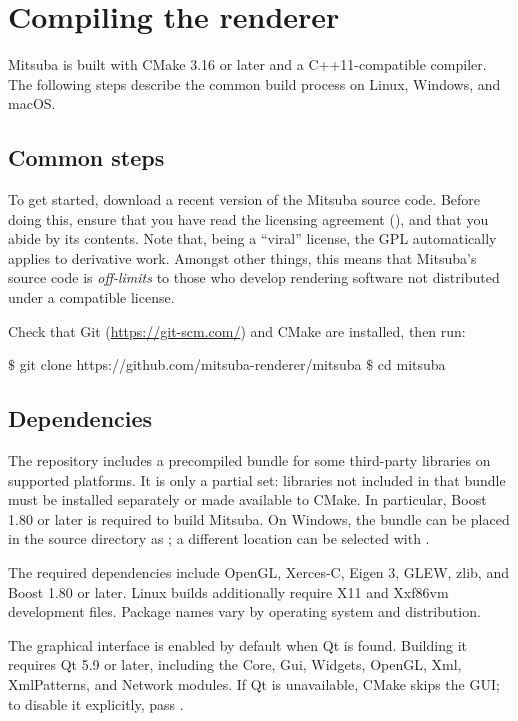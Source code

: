 \section{Compiling the renderer}
\label{sec:compiling}
Mitsuba is built with CMake 3.16 or later and a C++11-compatible compiler.
The following steps describe the common build process on Linux, Windows, and macOS.

\subsection{Common steps}
To get started, download a recent version of the Mitsuba source code. Before
doing this, ensure that you have read the licensing agreement
(), and that you abide by its contents. Note that, being a ``viral''
license, the GPL automatically applies to derivative work. Amongst other things, this
means that Mitsuba's source code is \emph{off-limits} to those who develop rendering
software not distributed under a compatible license.

Check that Git (\url{https://git-scm.com/}) and CMake are installed, then run:
\begin{shell}
$\texttt{\$}$ git clone https://github.com/mitsuba-renderer/mitsuba
$\texttt{\$}$ cd mitsuba
\end{shell}

\subsection{Dependencies}
The repository includes a precompiled  bundle for some third-party
libraries on supported platforms. It is only a partial set: libraries not included in
that bundle must be installed separately or made available to CMake. In particular,
Boost 1.80 or later is required to build Mitsuba. On Windows, the bundle can be placed
in the source directory as ; a different location can be selected
with .

The required dependencies include OpenGL, Xerces-C, Eigen 3, GLEW, zlib, and Boost
1.80 or later. Linux builds additionally require X11 and Xxf86vm development files.
Package names vary by operating system and distribution.

The graphical interface is enabled by default when Qt is found. Building it requires
Qt 5.9 or later, including the Core, Gui, Widgets, OpenGL, Xml, XmlPatterns, and Network
modules. If Qt is unavailable, CMake skips the GUI; to disable it explicitly, pass
.

